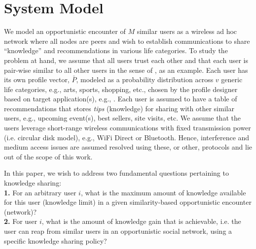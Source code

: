\documentclass[conference]{IEEEtran}
\theoremstyle{definition}
\begin{document}
\section{System Model}
\vspace{-0.1 cm}  
We model an opportunistic encounter of $M$ similar users as a wireless ad hoc network where 
all nodes are peers and wish to establish communications to share ``knowledge'' and recommendations in various life categories. To study the problem at hand, we assume that all users trust each other and that each user is pair-wise similar to all other users in the sense of \cite{mai14}, as an example. Each user has its own profile vector, $\bar{P}$, modeled as a probability distribution across $v$ generic life categories, e.g., arts, sports, shopping, etc., chosen by the profile designer based on target application(s), e.g., \cite{odp}. Each user is assumed to have a table of recommendations that stores \textit{tips} (knowledge) for sharing with other similar users, e.g., upcoming event(s), best sellers, site visits, etc. We assume that the users leverage short-range wireless communications with fixed transmission power (i.e. circular disk model), e.g., WiFi Direct or Bluetooth. Hence, interference and medium access issues are assumed resolved using these, or other, protocols and lie out of the scope of this work.

In this paper, we wish to address two fundamental questions pertaining to knowledge sharing:\\
{\bf 1.} For an arbitrary user $i$, what is the maximum amount of knowledge available for this user (knowledge limit) in a given similarity-based opportunistic encounter (network)?\\
{\bf 2.} For user $i$, what is the amount of knowledge gain that is achievable, i.e. the user can reap from similar users in an opportunistic social network, using a specific knowledge sharing policy?








\vspace{-0.2 cm}
\end{document}
